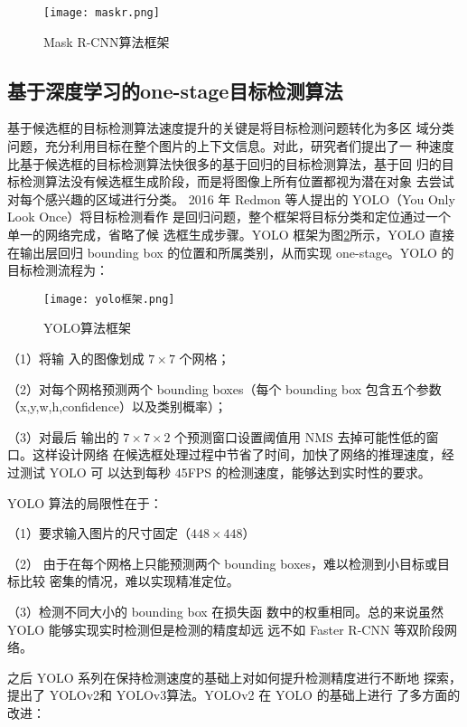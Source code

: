 \begin{figure}[htbp]
    \centering
    \texttt{[image: maskr.png]}
    \caption{Mask R-CNN算法框架}
    \label{maskr}
\end{figure}

\subsection{基于深度学习的one-stage目标检测算法}
基于候选框的目标检测算法速度提升的关键是将目标检测问题转化为多区
域分类问题，充分利用目标在整个图片的上下文信息。对此，研究者们提出了一
种速度比基于候选框的目标检测算法快很多的基于回归的目标检测算法，基于回
归的目标检测算法没有候选框生成阶段，而是将图像上所有位置都视为潜在对象
去尝试对每个感兴趣的区域进行分类\cite{jiao2019survey,wu2020recent}。
2016 年 Redmon 等人提出的 YOLO（You Only Look Once）将目标检测看作
是回归问题\cite{redmon2016you}，整个框架将目标分类和定位通过一个单一的网络完成，省略了候
选框生成步骤。YOLO 框架为图\ref{yk}所示，YOLO 直接在输出层回归 bounding box
的位置和所属类别，从而实现 one-stage。YOLO 的目标检测流程为：

\begin{figure}[htbp]
    \centering
    \texttt{[image: yolo框架.png]}
    \caption{YOLO算法框架}
    \label{yk}
\end{figure}

（1）将输
入的图像划成 $7 \times 7$ 个网格；

（2）对每个网格预测两个 bounding boxes（每个
bounding box 包含五个参数（x,y,w,h,confidence）以及类别概率）；

（3）对最后
输出的 $7 \times 7 \times 2$ 个预测窗口设置阈值用 NMS 去掉可能性低的窗口。这样设计网络
在候选框处理过程中节省了时间，加快了网络的推理速度，经过测试 YOLO 可
以达到每秒 45FPS 的检测速度，能够达到实时性的要求。

YOLO 算法的局限性在于：

（1）要求输入图片的尺寸固定（$448 \times 448$）

（2）
由于在每个网格上只能预测两个 bounding boxes，难以检测到小目标或目标比较
密集的情况，难以实现精准定位。

（3）检测不同大小的 bounding box 在损失函
数中的权重相同。总的来说虽然 YOLO 能够实现实时检测但是检测的精度却远
远不如 Faster R-CNN 等双阶段网络。

之后 YOLO 系列在保持检测速度的基础上对如何提升检测精度进行不断地
探索，提出了 YOLOv2\cite{redmon2017yolo9000}和 YOLOv3\cite{redmon2018yolov3}算法。YOLOv2 在 YOLO 的基础上进行
了多方面的改进：

